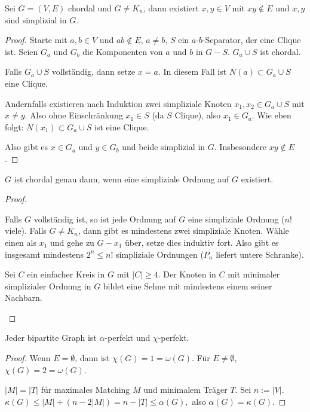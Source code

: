 \begin{lem}
    Sei $G = (V, E)$ chordal und $G \neq K_n$, dann existiert $x,y \in V$ mit $xy \not\in E$ und $x,y$ sind simplizial in $G$.
    \begin{proof}
        Starte mit $a,b \in V$ und $ab \not\in E$, $a \neq b$, $S$ ein $a$-$b$-Separator, der eine Clique ist.
        Seien $G_a$ und $G_b$ die Komponenten von $a$ und $b$ in $G - S$.
        $G_a \cup S$ ist chordal.

        Falls $G_a \cup S$ vollständig, dann setze $x = a$.
        In diesem Fall ist $N(a) \subset G_a \cup S$ eine Clique.

        Andernfalls existieren nach Induktion zwei simpliziale Knoten $x_1, x_2 \in G_a \cup S$ mit $x \neq y$.
        Also ohne Einschränkung $x_1 \in S$ (da $S$ Clique), also $x_1 \in G_a$.
        Wie eben folgt: $N(x_1) \subset G_a \cup S$ ist eine Clique.

        Also gibt es $x \in G_a$ und $y \in G_b$ und beide simplizial in $G$.
        Insbesondere $xy \not\in E$.
    \end{proof}
\end{lem}

\begin{st}
    $G$ ist chordal genau dann, wenn eine simpliziale Ordnung auf $G$ existiert.
    \begin{proof}
        \begin{seg}{\ProofImplication}
            Falls $G$ vollständig ist, so ist jede Ordnung auf $G$ eine simpliziale Ordnung ($n!$ viele).
            Falls $G \neq K_n$, dann gibt es mindestens zwei simpliziale Knoten.
            Wähle einen als $x_1$ und gehe zu $G - x_1$ über, setze dies induktiv fort.
            Also gibt es insgesamt mindestens $2^n \le n!$ simpliziale Ordnungen ($P_n$ liefert untere Schranke).
        \end{seg}
        \begin{seg}{\ProofImplication*}
            Sei $C$ ein einfacher Kreis in $G$ mit $|C| \ge 4$.
            Der Knoten in $C$ mit minimaler simplizialer Ordnung in $G$ bildet eine Sehne mit mindestens einem seiner Nachbarn.
        \end{seg}
    \end{proof}
\end{st}

\begin{st}
    Jeder bipartite Graph ist $\alpha$-perfekt und $\chi$-perfekt.
    \begin{proof}
        Wenn $E = \emptyset$, dann ist $\chi(G) = 1 = \omega(G)$.
        Für $E \neq \emptyset$, $\chi(G) = 2 = \omega(G)$.

        $|M| = |T|$ für maximales Matching $M$ und minimalem Träger $T$.
        Sei $n := |V|$.
        \begin{math}
            \kappa(G) \le |M| + (n - 2 |M|)
            = n - |T|
            \le \alpha(G),
        \end{math}
        also $\alpha(G) = \kappa(G)$.
    \end{proof}
\end{st}

